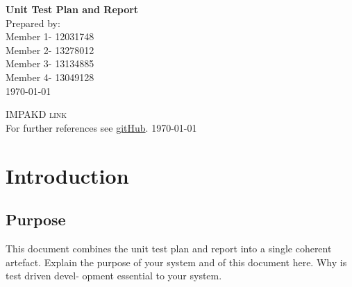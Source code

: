 \documentclass[a4paper,12pt]{article}
\begin{document}
\begin{titlepage}
\begin{center}


{ \huge \bfseries Unit Test Plan and Report}\\[4cm]


\hfill{\large Prepared by:}\\[0.5cm]
\hfill{\large Member 1- 12031748}\\[0.1cm]
\hfill{\large Member 2- 13278012}\\[0.1cm]
\hfill{\large Member 3- 13134885}\\[0.1cm]
\hfill{\large Member 4- 13049128}\\[0.5cm]
\hfill{\large \today}

\end{center}
\end{titlepage}
\renewcommand{\thesection}{\arabic{section}}

\newpage
\begin{center}
\textsc{\Large IMPAKD link}\\[0.5cm]
For further references see \href{https://github.com/u13278012/IMPAKD/}{gitHub}.
\today
\end{center}
\newpage
\tableofcontents{}

\setcounter{secnumdepth}{4}

\newpage
\section{Introduction}
\subsection{Purpose}
This document combines the unit test plan and report into a single coherent artefact.
Explain the purpose of your system and of this document here. Why is test driven devel-
opment essential to your system.
\end{document}
